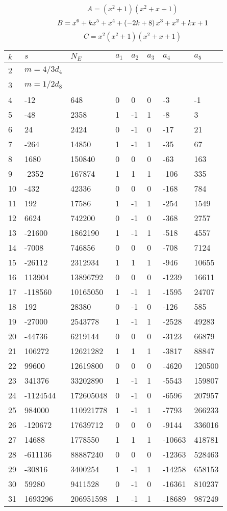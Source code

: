 \documentclass{amsart}
\begin{document}
$$A=(x^2
 + 1)(x^2
 + x
 + 1)$$
$$B=x^6
 + k\*x^5
 + x^4
 + \left(-2\*k
 + 8\right) \*x^3
 + x^2
 + k\*x
 + 1$$
$$C=x^2(x^2
 + 1)(x^2
 + x
 + 1)$$
\begin{longtable}{|l|l|l|lllll|}
\hline
$k$ & $s$ & $N_E$ & $a_1$ & $a_2$ & $a_3$ & $a_4$ & $a_5$\\
\hline
2&$m=4/3d_{4}$&&\multicolumn{5}{c|}{}\\
3&$m=1/2d_{8}$&&\multicolumn{5}{c|}{}\\
4&-12&648&0&0&0&-3&-1\\
5&-48&2358&1&-1&1&-8&3\\
6&24&2424&0&-1&0&-17&21\\
7&-264&14850&1&-1&1&-35&67\\
8&1680&150840&0&0&0&-63&163\\
9&-2352&167874&1&1&1&-106&335\\
10&-432&42336&0&0&0&-168&784\\
11&192&17586&1&-1&1&-254&1549\\
12&6624&742200&0&-1&0&-368&2757\\
13&-21600&1862190&1&-1&1&-518&4557\\
14&-7008&746856&0&0&0&-708&7124\\
15&-26112&2312934&1&1&1&-946&10655\\
16&113904&13896792&0&0&0&-1239&16611\\
17&-118560&10165050&1&-1&1&-1595&24707\\
18&192&28380&0&-1&0&-126&585\\
19&-27000&2543778&1&-1&1&-2528&49283\\
20&-44736&6219144&0&0&0&-3123&66879\\
21&106272&12621282&1&1&1&-3817&88847\\
22&99600&12619800&0&0&0&-4620&120500\\
23&341376&33202890&1&-1&1&-5543&159807\\
24&-1124544&172605048&0&-1&0&-6596&207957\\
25&984000&110921778&1&-1&1&-7793&266233\\
26&-120672&17639712&0&0&0&-9144&336016\\
27&14688&1778550&1&1&1&-10663&418781\\
28&-611136&88887240&0&0&0&-12363&528463\\
29&-30816&3400254&1&-1&1&-14258&658153\\
30&59280&9411528&0&-1&0&-16361&810237\\
31&1693296&206951598&1&-1&1&-18689&987249\\

\end{longtable}
\end{document}

